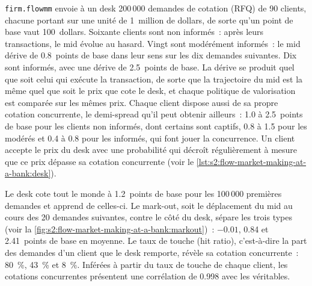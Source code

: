 \texttt{firm.flowmm} envoie à un desk 200\,000 demandes de cotation (RFQ) de 90 clients, chacune portant sur une unité de 1~million de dollars, de sorte qu'un point de base vaut 100~dollars. Soixante
clients sont non informés~: après leurs transactions, le mid évolue au hasard. Vingt sont modérément informés~: le mid dérive de 0.8~points de base dans leur sens
sur les dix demandes suivantes. Dix sont informés, avec une dérive de 2.5~points de base. La dérive se produit quel que soit celui qui exécute la transaction, de sorte que la trajectoire du mid est la même
quel que soit le prix que cote le desk, et chaque politique de valorisation est comparée sur les mêmes prix. Chaque client dispose aussi de sa propre cotation concurrente, le demi-spread
qu'il peut obtenir ailleurs~: 1.0 à 2.5~points de base pour les clients non informés, dont certains sont captifs, 0.8 à 1.5 pour les modérés et 0.4 à 0.8 pour les
informés, qui font jouer la concurrence. Un client accepte le prix du desk avec une probabilité qui décroît régulièrement à mesure que ce prix dépasse sa cotation concurrente
(voir le \cref{lst:s2:flow-market-making-at-a-bank:desk}).

Le desk cote tout le monde à 1.2~points de base pour les 100\,000 premières demandes et apprend de celles-ci. Le mark-out, soit le déplacement du mid au cours des 20
demandes suivantes, contre le côté du desk, sépare les trois types (voir la \cref{fig:s2:flow-market-making-at-a-bank:markout})~: $-0.01$, 0.84 et 2.41~points de base en moyenne.
Le taux de touche (hit ratio), c'est-à-dire la part des demandes d'un client que le desk remporte, révèle sa cotation concurrente~: 80~\%, 43~\% et 8~\%. Inférées à partir du
taux de touche de chaque client, les cotations concurrentes présentent une corrélation de 0.998 avec les véritables.

\begin{omfigure}

\label{fig:s2:flow-market-making-at-a-bank:markout}
\end{omfigure}

